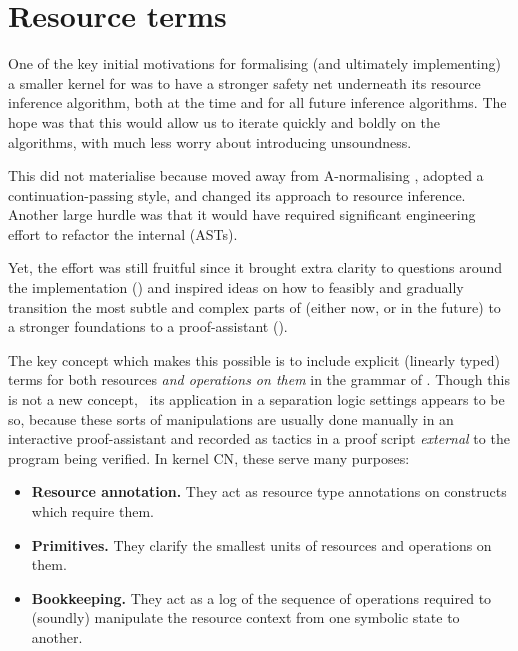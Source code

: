 \section{Resource terms}\label{subsec:res-terms}

One of the key initial motivations for formalising (and ultimately
implementing) a smaller kernel for  was to have a stronger safety net
underneath its resource inference algorithm, both at the time and for all
future inference algorithms. The hope was that this would allow us to iterate
quickly and boldly on the algorithms, with much less worry about introducing
unsoundness.

This did not materialise because  moved away from A-normalising
, adopted a continuation-passing style, and changed its approach to
resource inference. Another large hurdle was that it would have required
significant engineering effort to refactor the internal  (ASTs).

Yet, the effort was still fruitful since it brought extra clarity to questions
around the implementation () and inspired ideas on
how to feasibly and gradually transition the most subtle and complex parts of
 (either now, or in the future) to a stronger foundations to a
proof-assistant ().

The key concept which makes this possible is to include explicit (linearly
typed) terms for both resources \emph{and operations on them} in the grammar of
. Though this is not a new
concept,~ its application in a
separation logic settings appears to be so, because these sorts of
manipulations are usually done manually in an interactive proof-assistant and
recorded as tactics in a proof script \emph{external} to the program being
verified. In {kernel CN}, these  serve many purposes:
\begin{itemize}
    \item \textbf{Resource annotation.} They act as resource type annotations
        on constructs which require them.
    \item \textbf{Primitives.} They clarify the smallest units of
        resources and operations on them.
    \item \textbf{Bookkeeping.} They act as a log of the sequence of operations
        required to (soundly) manipulate the resource context from one symbolic
        state to another.
\end{itemize}

